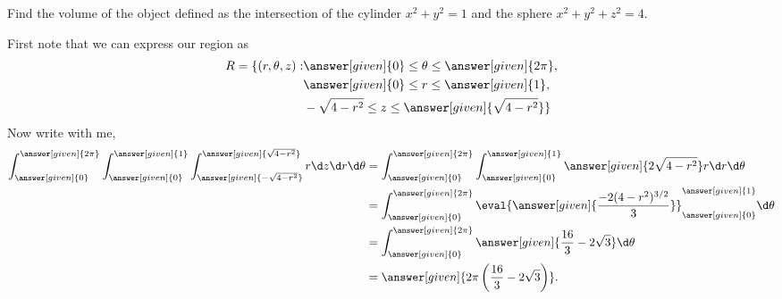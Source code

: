 \documentclass{ximera}
\begin{document}
\begin{example}
  Find the volume of the object defined as the intersection of the
  cylinder $x^2+y^2=1$ and the sphere $x^2+y^2+z^2=4$.
  \begin{explanation}
    First note that we can express our region as
    \begin{align*}
      R=\{(r,\theta,z):&\answer[given]{0}\leq\theta\leq\answer[given]{2\pi}, \\
      &\answer[given]{0}\leq r\leq \answer[given]{1}, \\
      &-\sqrt{4-r^2}\le z\le \answer[given]{\sqrt{4-r^2}}\}
    \end{align*}
    Now write with me,
    \begin{align*}
      \int_{\answer[given]{0}}^{\answer[given]{2\pi}}
      \int_{\answer[given]{0}}^{\answer[given]{1}}
      \int_{\answer[given]{-\sqrt{4-r^2}}}^{\answer[given]{\sqrt{4-r^2}}} r \d z \d r \d \theta
      &=
      \int_{\answer[given]{0}}^{\answer[given]{2\pi}}
      \int_{\answer[given]{0}}^{\answer[given]{1}}
      \answer[given]{2\sqrt{4-r^2}} r \d r \d \theta\\
      &=\int_{\answer[given]{0}}^{\answer[given]{2\pi}}
      \eval{\answer[given]{\frac{-2(4-r^2)^{3/2}}{3}}}_{\answer[given]{0}}^{\answer[given]{1}}  \d \theta\\
      &=\int_{\answer[given]{0}}^{\answer[given]{2\pi}}
      \answer[given]{\frac{16}{3}-2\sqrt{3}}  \d \theta\\
      &=\answer[given]{2\pi\left(\frac{16}{3}-2\sqrt{3}\right)}.
    \end{align*}
  \end{explanation}
\end{example}
\end{document}
